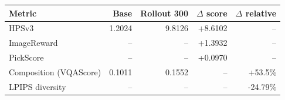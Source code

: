 \begin{tabularx}{\textwidth}{@{}Xrrrr@{}}
\toprule
Metric & Base & Rollout 300 & $\Delta$ score & $\Delta$ relative \\
\midrule
HPSv3 & 1.2024 & 9.8126 & +8.6102 & -- \\
ImageReward & -- & -- & +1.3932 & -- \\
PickScore & -- & -- & +0.0970 & -- \\
Composition (VQAScore) & 0.1011 & 0.1552 & -- & +53.5\% \\
LPIPS diversity & -- & -- & -- & -24.79\% \\
\bottomrule
\end{tabularx}

